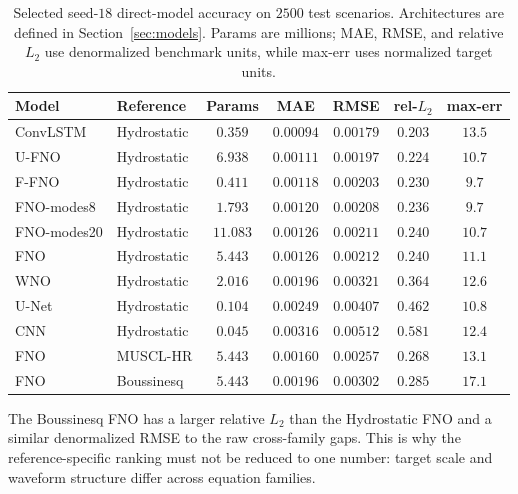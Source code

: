 \begin{table}[pos=!htbp]
\centering
\caption{Selected seed-$18$ direct-model accuracy on $2500$ test scenarios. Architectures are defined in Section~\ref{sec:models}. Params are millions; MAE, RMSE, and relative $L_2$ use denormalized benchmark units, while max-err uses normalized target units.}
\label{tab:accuracy}
\small
\begin{tabular}{llccccc}
    \toprule
    Model & Reference & Params & MAE & RMSE & rel-$L_2$ & max-err \\
    \midrule
    ConvLSTM    & Hydrostatic & $0.359$  & $0.00094$ & $0.00179$ & $\mathbf{0.203}$ & $13.5$ \\
    U-FNO       & Hydrostatic & $6.938$  & $0.00111$ & $0.00197$ & $0.224$ & $10.7$ \\
    F-FNO       & Hydrostatic & $0.411$  & $0.00118$ & $0.00203$ & $0.230$ & $9.7$ \\
    FNO-modes8  & Hydrostatic & $1.793$  & $0.00120$ & $0.00208$ & $0.236$ & $9.7$ \\
    FNO-modes20 & Hydrostatic & $11.083$ & $0.00126$ & $0.00211$ & $0.240$ & $10.7$ \\
    FNO         & Hydrostatic & $5.443$  & $0.00126$ & $0.00212$ & $0.240$ & $11.1$ \\
    WNO         & Hydrostatic & $2.016$  & $0.00196$ & $0.00321$ & $0.364$ & $12.6$ \\
    U-Net       & Hydrostatic & $0.104$  & $0.00249$ & $0.00407$ & $0.462$ & $10.8$ \\
    CNN         & Hydrostatic & $0.045$  & $0.00316$ & $0.00512$ & $0.581$ & $12.4$ \\
    \midrule
    FNO         & MUSCL-HR    & $5.443$  & $0.00160$ & $0.00257$ & $0.268$ & $13.1$ \\
    FNO         & Boussinesq  & $5.443$  & $0.00196$ & $0.00302$ & $0.285$ & $17.1$ \\
    \bottomrule
\end{tabular}
\end{table}

The Boussinesq FNO has a larger relative $L_2$ than the Hydrostatic FNO and a similar denormalized RMSE to the raw cross-family gaps. This is why the reference-specific ranking must not be reduced to one number: target scale and waveform structure differ across equation families.

